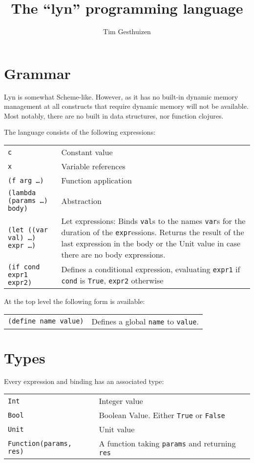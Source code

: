 \documentclass[a4paper, 11pt]{article}
\title{The ``lyn'' programming language}
\author{Tim Gesthuizen}
\begin{document}
\maketitle

\section{Grammar}

Lyn is somewhat Scheme-like.
However, as it has no built-in dynamic memory management at all
constructs that require dynamic memory will not be available.
Most notably, there are no built in data structures, nor function
clojures.

The language consists of the following expressions:\\[1.5ex]
\begin{tabularx}{\linewidth}{lX}
  \texttt{c} & Constant value\\
  \texttt{x} & Variable references\\
  \texttt{(f arg \ldots)} & Function application\\
  \texttt{(lambda (params \ldots) body)} & Abstraction\\
  \texttt{(let ((var val) \ldots) expr \ldots)} & Let expressions:
  Binds \texttt{val}s to the names \texttt{var}s for the duration of
  the \texttt{expr}essions.
  Returns the result of the last expression in the body or the Unit
  value in case there are no body expressions.\\
  \texttt{(if cond expr1 expr2)} & Defines a conditional
  expression, evaluating \texttt{expr1} if \texttt{cond} is
  \texttt{True}, \texttt{expr2} otherwise\\
\end{tabularx}

At the top level the following form is available:\\[1.5ex]
\begin{tabularx}{\linewidth}{lX}
  \texttt{(define name value)} & Defines a global \texttt{name} to
                                 \texttt{value}.
\end{tabularx}

\section{Types}

Every expression and binding has an associated type:\\[1.5ex]
\begin{tabularx}{\linewidth}{lX}
  \texttt{Int} & Integer value\\
  \texttt{Bool} & Boolean Value. Either \texttt{True} or
  \texttt{False}\\
  \texttt{Unit} & Unit value\\
  \texttt{Function(params, res)} & A function taking \texttt{params}
  and returning \texttt{res}\\
\end{tabularx}
\end{document}
